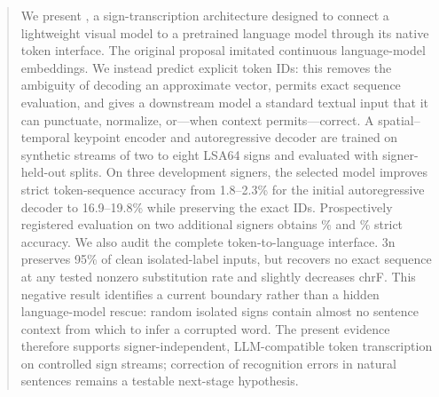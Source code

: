 \begin{abstract}
We present \system, a sign-transcription architecture designed to connect a
lightweight visual model to a pretrained language model through its native token
interface.  The original \system{} proposal imitated continuous language-model
embeddings.  We instead predict explicit \Gemma{} token IDs: this removes the
ambiguity of decoding an approximate vector, permits exact sequence evaluation,
and gives a downstream \Gemma{} model a standard textual input that it can
punctuate, normalize, or---when context permits---correct.  A spatial--temporal
keypoint encoder and autoregressive decoder are trained on synthetic streams of
two to eight LSA64 signs and evaluated with signer-held-out splits.  On three
development signers, the selected model improves strict token-sequence accuracy
from 1.8--2.3\% for the initial autoregressive decoder to 16.9--19.8\% while
preserving the exact \Gemma{} IDs.  Prospectively registered evaluation on two
additional signers obtains \FoldSevenExact\% and \FoldEightExact\% strict
accuracy.  We also audit the complete token-to-language interface.  \Gemma{} 3n
preserves 95\% of clean isolated-label inputs, but recovers no exact sequence at
any tested nonzero substitution rate and slightly decreases chrF.  This negative
result identifies a current boundary rather than a hidden language-model rescue:
random isolated signs contain almost no sentence context from which to infer a
corrupted word.  The present evidence therefore supports signer-independent,
LLM-compatible token transcription on controlled sign streams; correction of
recognition errors in natural sentences remains a testable next-stage hypothesis.

\end{abstract}
